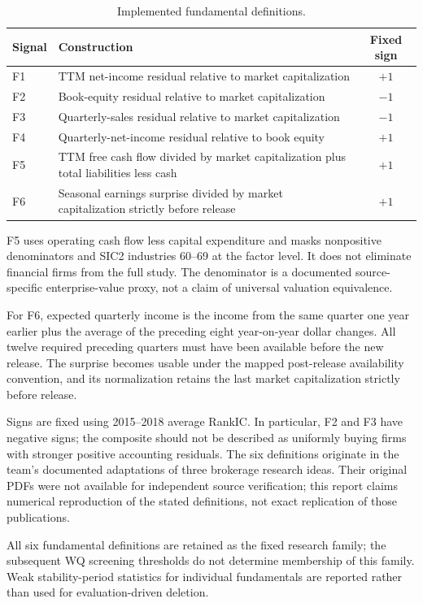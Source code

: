\documentclass[11pt]{article}
\begin{document}
\begin{table}[H]\centering\small
\caption{Implemented fundamental definitions.}\label{tab:definitions}
\begin{tabularx}{\textwidth}{l X c}\toprule Signal & Construction & Fixed sign\\\midrule
F1 & TTM net-income residual relative to market capitalization & $+1$\\
F2 & Book-equity residual relative to market capitalization & $-1$\\
F3 & Quarterly-sales residual relative to market capitalization & $-1$\\
F4 & Quarterly-net-income residual relative to book equity & $+1$\\
F5 & TTM free cash flow divided by market capitalization plus total liabilities less cash & $+1$\\
F6 & Seasonal earnings surprise divided by market capitalization strictly before release & $+1$\\\bottomrule
\end{tabularx}\end{table}

F5 uses operating cash flow less capital expenditure and masks nonpositive denominators and SIC2 industries 60--69 at the factor level. It does not eliminate financial firms from the full study. The denominator is a documented source-specific enterprise-value proxy, not a claim of universal valuation equivalence.

For F6, expected quarterly income is the income from the same quarter one year earlier plus the average of the preceding eight year-on-year dollar changes. All twelve required preceding quarters must have been available before the new release. The surprise becomes usable under the mapped post-release availability convention, and its normalization retains the last market capitalization strictly before release.

Signs are fixed using 2015--2018 average RankIC. In particular, F2 and F3 have negative signs; the composite should not be described as uniformly buying firms with stronger positive accounting residuals. The six definitions originate in the team's documented adaptations of three brokerage research ideas. Their original PDFs were not available for independent source verification; this report claims numerical reproduction of the stated definitions, not exact replication of those publications.

All six fundamental definitions are retained as the fixed research family; the subsequent WQ screening thresholds do not determine membership of this family. Weak stability-period statistics for individual fundamentals are reported rather than used for evaluation-driven deletion.
\clearpage
\end{document}
